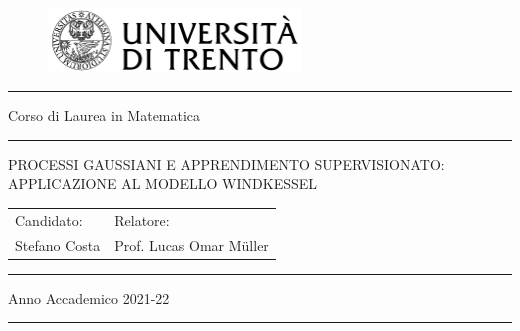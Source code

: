 

\begin{figure}[H]
\centering
\includegraphics[width=0.6\textwidth]{images/MARCHIO UNITN NERO.png}
\end{figure}

\setlength{\parskip}{-12pt} %
\noindent\rule{\textwidth}{1pt}
\begin{center}
\Large Corso di Laurea  in Matematica
\end{center}
\noindent\rule{\textwidth}{1pt}

\vspace{5 cm} %


\begin{center}
{\fontsize{20}{30} \selectfont PROCESSI GAUSSIANI E APPRENDIMENTO SUPERVISIONATO: APPLICAZIONE AL MODELLO WINDKESSEL \par} %
\end{center}


\vspace{6 cm} %


\begin{large}
\begin{tabular}{m{7cm}l}
Candidato: & Relatore:\\
Stefano Costa & Prof. Lucas Omar Müller
\end{tabular}
\end{large}


\vfill %

\setlength{\parskip}{-18pt} %
\noindent\rule{\textwidth}{1pt}
\begin{center}
{Anno Accademico 2021-22}
\end{center}
\noindent\rule{\textwidth}{1pt}
\setlength{\parskip}{0pt} %